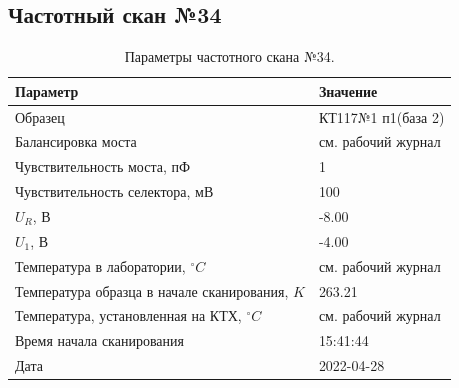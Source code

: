 \subsection{Частотный скан №34}
\begin{table}[!ht]
    \centering
    \caption{Параметры частотного скана №34.}
    \begin{tabular}{|l|l|}
        \hline
        Параметр                                       & Значение                  \\ \hline
        Образец                                        & КТ117№1 п1(база 2)        \\ \hline
        Балансировка моста                             & см. рабочий журнал        \\ \hline
        Чувствительность моста, пФ                     & 1                         \\ \hline
        Чувствительность селектора, мВ                 & 100                       \\ \hline
        $U_R$, В                                       & -8.00                     \\ \hline
        $U_1$, В                                       & -4.00                     \\ \hline
        Температура в лаборатории, $^\circ C$          & см. рабочий журнал        \\ \hline
        Температура образца в начале сканирования, $K$ & 263.21                    \\ \hline
        Температура, установленная на КТХ, $^\circ C$  & см. рабочий журнал        \\ \hline
        Время начала сканирования                      & 15:41:44                  \\ \hline
        Дата                                           & 2022-04-28                \\ \hline
    \end{tabular}
    \label{table:frequency_scan_34}
\end{table}

